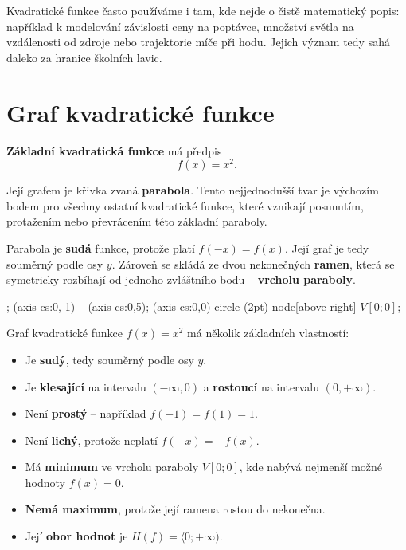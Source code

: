 \documentclass[12pt,a4paper]{article}
\begin{document}
\begin{notebox}
Kvadratické funkce často používáme i tam, kde nejde o čistě matematický popis: například k 
modelování závislosti ceny na poptávce, množství světla na vzdálenosti od zdroje nebo trajektorie míče při hodu.  
Jejich význam tedy sahá daleko za hranice školních lavic.
\end{notebox}

\newpage
\section{Graf kvadratické funkce}

\begin{definitionbox}
\textbf{Základní kvadratická funkce} má předpis
\[
f(x) = x^2.
\]

Její grafem je křivka zvaná \textbf{parabola}.  
Tento nejjednodušší tvar je výchozím bodem pro všechny ostatní kvadratické funkce, které vznikají posunutím, protažením nebo převrácením této základní paraboly.

\medskip
Parabola je \textbf{sudá} funkce, protože platí \(f(-x) = f(x)\).  
Její graf je tedy souměrný podle osy $y$.  
Zároveň se skládá ze dvou nekonečných \textbf{ramen}, která se symetricky rozbíhají od jednoho zvláštního bodu – \textbf{vrcholu paraboly}.
\end{definitionbox}

\begin{center}
\begin{axisgraph}[
  xmin=-4, xmax=4,
  ymin=-1, ymax=5,
  samples=200,
  width=10cm,
  height=7cm,
  domain=-2.2:2.2,
  title={Graf funkce $y = x^2$}
]
  ;
   (axis cs:0,-1) -- (axis cs:0,5);
   (axis cs:0,0) circle (2pt) node[above right] {$V[0;0]$};
\end{axisgraph}
\end{center}

\begin{notebox}
Graf kvadratické funkce \(f(x)=x^2\) má několik základních vlastností:
\begin{itemize}
  \item Je \textbf{sudý}, tedy souměrný podle osy $y$.
  \item Je \textbf{klesající} na intervalu \((-\infty, 0)\) a \textbf{rostoucí} na intervalu \((0, +\infty)\).
  \item Není \textbf{prostý} – například \(f(-1) = f(1) = 1\).
  \item Není \textbf{lichý}, protože neplatí \(f(-x) = -f(x)\).
  \item Má \textbf{minimum} ve vrcholu paraboly \(V[0;0]\), kde nabývá nejmenší možné hodnoty \(f(x) = 0\).
  \item \textbf{Nemá maximum}, protože její ramena rostou do nekonečna.
  \item Její \textbf{obor hodnot} je \(H(f) = \langle 0; +\infty)\).
\end{itemize}
\end{notebox}
\end{document}
